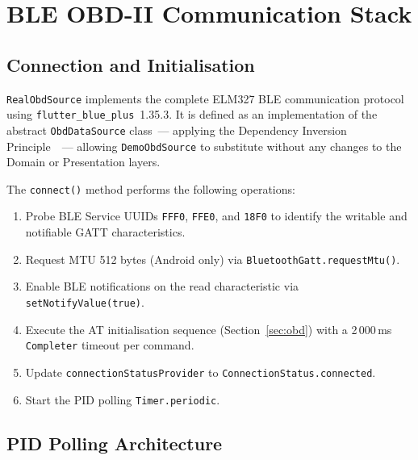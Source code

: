 
\section{BLE OBD-II Communication Stack}
\label{sec:ble}

\subsection{Connection and Initialisation}

\texttt{RealObdSource} implements the complete ELM327 BLE communication protocol using \texttt{flutter\_blue\_plus}~1.35.3.
It is defined as an implementation of the abstract \texttt{ObdDataSource} class~--- applying the Dependency Inversion Principle~\cite{martin2017}~--- allowing \texttt{DemoObdSource} to substitute without any changes to the Domain or Presentation layers.

The \texttt{connect()} method performs the following operations:
\begin{enumerate}
  \item Probe BLE Service UUIDs \texttt{FFF0}, \texttt{FFE0}, and \texttt{18F0} to identify the writable and notifiable GATT characteristics.
  \item Request MTU 512 bytes (Android only) via \texttt{BluetoothGatt.requestMtu()}.
  \item Enable BLE notifications on the read characteristic via \texttt{setNotifyValue(true)}.
  \item Execute the AT initialisation sequence (Section~\ref{sec:obd}) with a 2\,000\,ms \texttt{Completer} timeout per command.
  \item Update \texttt{connectionStatusProvider} to \texttt{ConnectionStatus.connected}.
  \item Start the PID polling \texttt{Timer.periodic}.
\end{enumerate}


\subsection{PID Polling Architecture}

